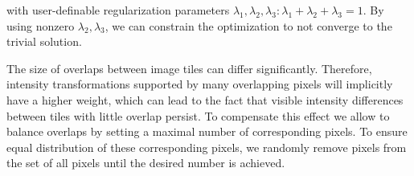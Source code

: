 with user-definable regularization parameters $\lambda_1, \lambda_2, \lambda_3: \lambda_1+ \lambda_2+\lambda_3 = 1$. By using nonzero $\lambda_2, \lambda_3$, we can constrain the optimization to not converge to the trivial solution.

The size of overlaps between image tiles can differ significantly. Therefore, intensity transformations supported by many overlapping pixels will implicitly have a higher weight, which can lead to the fact that visible intensity differences between tiles with little overlap persist. To compensate this effect we allow to balance overlaps by setting a maximal number of corresponding pixels. To ensure equal distribution of these corresponding pixels, we randomly remove pixels from the set of all pixels until the desired number is achieved.


\begin{comment}
\section{Headless operation}

In addition to the graphical user interface (GUI), we offer ImageJ \texttt{Plugin}s for most of the individual steps, such as data import, illumination selection, pairwise shift calculation, link filtering, global optimization and image fusion/deconvolution. The results will not be displayed interactively but saved to the XML project file or output files immediately. The individual steps can be recorded as ImageJ \emph{macros} \cite{imagej, macro-operation} and easily combined into a script for headless batch processing. 
\end{comment}
